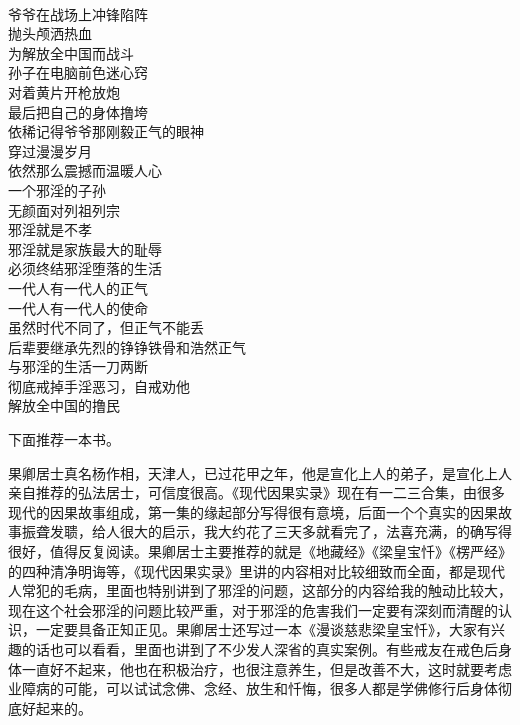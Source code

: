 \begin{poem}[两代人]
    \begin{multicols}{2}
        \begin{center}~\\
            爷爷在战场上冲锋陷阵 \\ 抛头颅洒热血 \\ 为解放全中国而战斗 \\ 孙子在电脑前色迷心窍 \\ 对着黄片开枪放炮 \\ 最后把自己的身体撸垮 \\ 依稀记得爷爷那刚毅正气的眼神 \\ 穿过漫漫岁月 \\ 依然那么震撼而温暖人心 \\ 一个邪淫的子孙 \\ 无颜面对列祖列宗 \\ 邪淫就是不孝 \\ 邪淫就是家族最大的耻辱 \\ 必须终结邪淫堕落的生活 \\ 一代人有一代人的正气 \\ 一代人有一代人的使命 \\ 虽然时代不同了，但正气不能丢 \\ 后辈要继承先烈的铮铮铁骨和浩然正气 \\ 与邪淫的生活一刀两断 \\ 彻底戒掉手淫恶习，自戒劝他 \\ 解放全中国的撸民
        \end{center}
    \end{multicols}
\end{poem}

下面推荐一本书。

\begin{book}
    果卿居士真名杨作相，天津人，已过花甲之年，他是宣化上人的弟子，是宣化上人亲自推荐的弘法居士，可信度很高。《现代因果实录》现在有一二三合集，由很多现代的因果故事组成，第一集的缘起部分写得很有意境，后面一个个真实的因果故事振聋发聩，给人很大的启示，我大约花了三天多就看完了，法喜充满，的确写得很好，值得反复阅读。果卿居士主要推荐的就是《地藏经》《梁皇宝忏》《楞严经》的四种清净明诲等，《现代因果实录》里讲的内容相对比较细致而全面，都是现代人常犯的毛病，里面也特别讲到了邪淫的问题，这部分的内容给我的触动比较大，现在这个社会邪淫的问题比较严重，对于邪淫的危害我们一定要有深刻而清醒的认识，一定要具备正知正见。果卿居士还写过一本《漫谈慈悲梁皇宝忏》，大家有兴趣的话也可以看看，里面也讲到了不少发人深省的真实案例。有些戒友在戒色后身体一直好不起来，他也在积极治疗，也很注意养生，但是改善不大，这时就要考虑业障病的可能，可以试试念佛、念经、放生和忏悔，很多人都是学佛修行后身体彻底好起来的。
\end{book}
